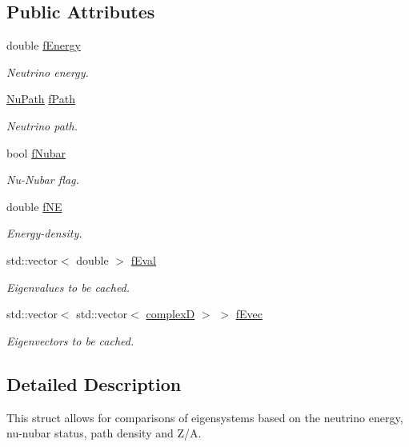 \subsection*{Public Attributes}
\begin{DoxyCompactItemize}
\item 
double \hyperlink{structOscProb_1_1EigenPoint_a539fc09adbccea30cf2eb4bf7d0b3a6c}{f\+Energy}
\begin{DoxyCompactList}\small\item\em Neutrino energy. \end{DoxyCompactList}\item 
\hyperlink{structOscProb_1_1NuPath}{Nu\+Path} \hyperlink{structOscProb_1_1EigenPoint_a1c263b6ceef5bd4de3181182f944efbb}{f\+Path}
\begin{DoxyCompactList}\small\item\em Neutrino path. \end{DoxyCompactList}\item 
bool \hyperlink{structOscProb_1_1EigenPoint_a42655458f601a178afca216036e7b7d8}{f\+Nubar}
\begin{DoxyCompactList}\small\item\em Nu-\/\+Nubar flag. \end{DoxyCompactList}\item 
double \hyperlink{structOscProb_1_1EigenPoint_af985afcb8012deb6de4fcba66342e0d2}{f\+NE}
\begin{DoxyCompactList}\small\item\em Energy-\/density. \end{DoxyCompactList}\item 
std\+::vector$<$ double $>$ \hyperlink{structOscProb_1_1EigenPoint_a5c5e729d82e3aca1964c1777f4882f9d}{f\+Eval}
\begin{DoxyCompactList}\small\item\em Eigenvalues to be cached. \end{DoxyCompactList}\item 
std\+::vector$<$ std\+::vector$<$ \hyperlink{EigenPoint_8h_a67ca8e107e20610c3fff78d5e726ece0}{complexD} $>$ $>$ \hyperlink{structOscProb_1_1EigenPoint_adf3ccb3d88ea1ae6ef3635fea8748e09}{f\+Evec}
\begin{DoxyCompactList}\small\item\em Eigenvectors to be cached. \end{DoxyCompactList}\end{DoxyCompactItemize}


\subsection{Detailed Description}
This struct allows for comparisons of eigensystems based on the neutrino energy, nu-\/nubar status, path density and Z/A.


